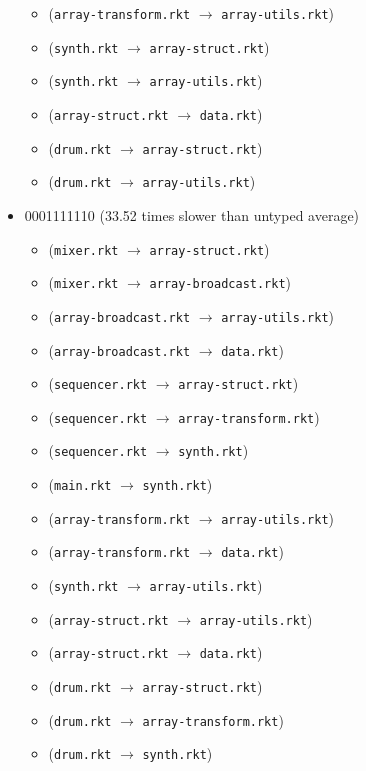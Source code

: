 \documentclass{article}
\newcommand{\mono}[1]{\texttt{#1}}
\begin{document}
\begin{itemize}
\begin{itemize}
  \item (\mono{array-transform.rkt} $\rightarrow$ \mono{array-utils.rkt})
  \item (\mono{synth.rkt} $\rightarrow$ \mono{array-struct.rkt})
  \item (\mono{synth.rkt} $\rightarrow$ \mono{array-utils.rkt})
  \item (\mono{array-struct.rkt} $\rightarrow$ \mono{data.rkt})
  \item (\mono{drum.rkt} $\rightarrow$ \mono{array-struct.rkt})
  \item (\mono{drum.rkt} $\rightarrow$ \mono{array-utils.rkt})
  \end{itemize}
\item 0001111110 (33.52 times slower than untyped average)
  \begin{itemize}
  \item (\mono{mixer.rkt} $\rightarrow$ \mono{array-struct.rkt})
  \item (\mono{mixer.rkt} $\rightarrow$ \mono{array-broadcast.rkt})
  \item (\mono{array-broadcast.rkt} $\rightarrow$ \mono{array-utils.rkt})
  \item (\mono{array-broadcast.rkt} $\rightarrow$ \mono{data.rkt})
  \item (\mono{sequencer.rkt} $\rightarrow$ \mono{array-struct.rkt})
  \item (\mono{sequencer.rkt} $\rightarrow$ \mono{array-transform.rkt})
  \item (\mono{sequencer.rkt} $\rightarrow$ \mono{synth.rkt})
  \item (\mono{main.rkt} $\rightarrow$ \mono{synth.rkt})
  \item (\mono{array-transform.rkt} $\rightarrow$ \mono{array-utils.rkt})
  \item (\mono{array-transform.rkt} $\rightarrow$ \mono{data.rkt})
  \item (\mono{synth.rkt} $\rightarrow$ \mono{array-utils.rkt})
  \item (\mono{array-struct.rkt} $\rightarrow$ \mono{array-utils.rkt})
  \item (\mono{array-struct.rkt} $\rightarrow$ \mono{data.rkt})
  \item (\mono{drum.rkt} $\rightarrow$ \mono{array-struct.rkt})
  \item (\mono{drum.rkt} $\rightarrow$ \mono{array-transform.rkt})
  \item (\mono{drum.rkt} $\rightarrow$ \mono{synth.rkt})
  \end{itemize}

\end{itemize}
\end{document}
